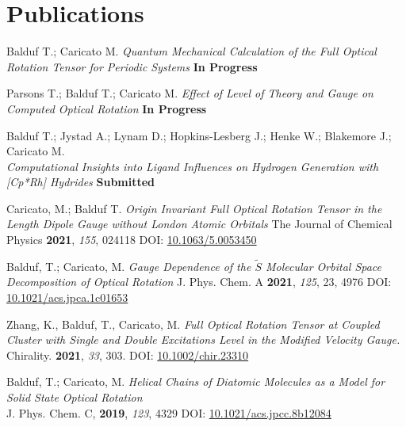 \documentclass[a4paper,20pt]{article}
\begin{document}
\section{Publications}
  \begin{etaremune}
  \item Balduf T.; Caricato M. \textit{Quantum Mechanical Calculation of the Full Optical Rotation Tensor for Periodic Systems} \textbf{In Progress}
  \item Parsons T.; Balduf T.; Caricato M. \textit{Effect of Level of Theory and Gauge on Computed Optical Rotation} \textbf{In Progress}
  \item Balduf T.; Jystad A.; Lynam D.; Hopkins-Lesberg J.;  Henke W.; Blakemore J.; Caricato M. \\ \textit{Computational Insights into Ligand Influences on Hydrogen Generation with [Cp*Rh] Hydrides} \textbf{Submitted} 
  \item Caricato, M.; Balduf T. \textit{Origin Invariant Full Optical Rotation Tensor in the Length Dipole Gauge without London Atomic Orbitals} The Journal of Chemical Physics \textbf{2021}, \textit{155}, 024118 DOI: \href{https://doi.org/10.1063/5.0053450}{10.1063/5.0053450} 
  \item Balduf, T.; Caricato, M. \textit{Gauge Dependence of the $\tilde{S}$ Molecular Orbital Space Decomposition of Optical Rotation} J. Phys. Chem. A \textbf{2021}, \textit{125}, 23, 4976 DOI: \href{https://doi.org/10.1021/acs.jpca.1c01653}{10.1021/acs.jpca.1c01653} 
  \item Zhang, K., Balduf, T., Caricato, M. \textit{Full Optical Rotation Tensor at Coupled Cluster with Single and Double Excitations Level in the Modified Velocity Gauge.} Chirality. \textbf{2021}, \textit{33}, 303. DOI:   \href{https://doi.org/10.1002/chir.23310}{10.1002/chir.23310}
  \item Balduf, T.; Caricato, M. \textit{Helical Chains of Diatomic Molecules as a Model for Solid State Optical Rotation} \\J. Phys. Chem. C, \textbf{2019}, \textit{123}, 4329 DOI: \href{https://doi.org/10.1021/acs.jpcc.8b12084}{10.1021/acs.jpcc.8b12084} 
  \end{etaremune}
\vspace{-5pt}
	    
\vspace{-5pt}
\end{document}
